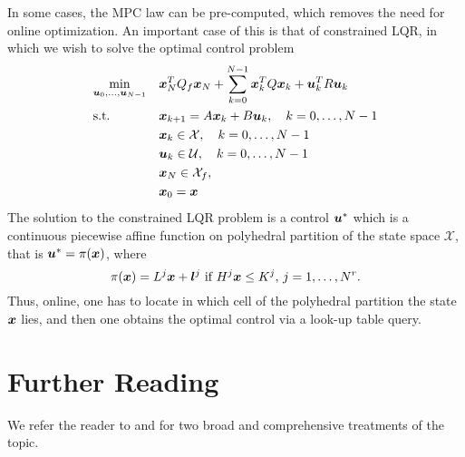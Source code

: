 In some cases, the MPC law can be pre-computed, which removes the need for online optimization. An important case of this is that of constrained LQR, in which we wish to solve the optimal control problem
\begin{equation}
\begin{aligned}
\label{eq:ocp}
& \underset{\bm{u}_{0}, \ldots, \bm{u}_{N-1}}{\min} & & \bm{x}_N^T Q_f \bm{x}_N + \sum_{k=0}^{N-1} \bm{x}_k^T Q \bm{x}_k + \bm{u}_k^T R \bm{u}_k\\
& \textrm{s.t.} & & \bm{x}_{k+1} = A \bm{x}_{k} + B \bm{u}_{k}, \quad k = 0, \ldots, N-1 \\
& & & \bm{x}_{k} \in \mathcal{X},  \quad k = 0, \ldots, N-1 \\
& & & \bm{u}_{k} \in \mathcal{U},  \quad k = 0, \ldots, N-1 \\
& & & \bm{x}_{N} \in \mathcal{X}_f, \\
& & & \bm{x}_{0} = \bm{x}
\end{aligned}
\end{equation}
The solution to the constrained LQR problem is a control $\bm{u}^*$ which is a continuous piecewise affine function on polyhedral partition of the state space $\mathcal{X}$, that is $\bm{u}^* = \pi(\bm{x})$, where
\begin{equation}
    \pi(\bm{x}) = L^j \bm{x} + \bm{l}^j\,\,\text{if}\,\, H^j\bm{x} \leq K^j, \, j = 1, \ldots, N^r.
\end{equation}
Thus, online, one has to locate in which cell of the polyhedral partition the state $\bm{x}$ lies, and then one obtains the optimal control via a look-up table query.

\section{Further Reading}

We refer the reader to \cite{borrelli2017predictive} and \cite{rawlings2017model} for two broad and comprehensive treatments of the topic. 